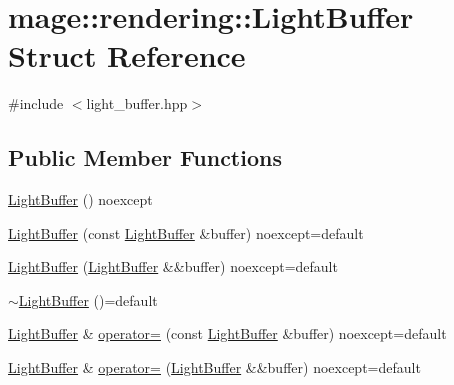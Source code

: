 \hypertarget{structmage_1_1rendering_1_1_light_buffer}{}\section{mage\+:\+:rendering\+:\+:Light\+Buffer Struct Reference}
\label{structmage_1_1rendering_1_1_light_buffer}


{\ttfamily \#include $<$light\+\_\+buffer.\+hpp$>$}

\subsection*{Public Member Functions}
\begin{DoxyCompactItemize}
\item 
\mbox{\hyperlink{structmage_1_1rendering_1_1_light_buffer_ad31355f44f8e31f540fa40c81e659fca}{Light\+Buffer}} () noexcept
\item 
\mbox{\hyperlink{structmage_1_1rendering_1_1_light_buffer_ae5f4964ae3773e590a8fe07e3b6bcdfa}{Light\+Buffer}} (const \mbox{\hyperlink{structmage_1_1rendering_1_1_light_buffer}{Light\+Buffer}} \&buffer) noexcept=default
\item 
\mbox{\hyperlink{structmage_1_1rendering_1_1_light_buffer_a016cbba8dd68da2f80a7018e2276070d}{Light\+Buffer}} (\mbox{\hyperlink{structmage_1_1rendering_1_1_light_buffer}{Light\+Buffer}} \&\&buffer) noexcept=default
\item 
\mbox{\hyperlink{structmage_1_1rendering_1_1_light_buffer_a36fd7699f61cde6359d6934428eb9daf}{$\sim$\+Light\+Buffer}} ()=default
\item 
\mbox{\hyperlink{structmage_1_1rendering_1_1_light_buffer}{Light\+Buffer}} \& \mbox{\hyperlink{structmage_1_1rendering_1_1_light_buffer_a409af50e3d21571e56b36c6c88769a65}{operator=}} (const \mbox{\hyperlink{structmage_1_1rendering_1_1_light_buffer}{Light\+Buffer}} \&buffer) noexcept=default
\item 
\mbox{\hyperlink{structmage_1_1rendering_1_1_light_buffer}{Light\+Buffer}} \& \mbox{\hyperlink{structmage_1_1rendering_1_1_light_buffer_abe8ee3df1e5c2ce28aaab03ce729a184}{operator=}} (\mbox{\hyperlink{structmage_1_1rendering_1_1_light_buffer}{Light\+Buffer}} \&\&buffer) noexcept=default
\end{DoxyCompactItemize}
